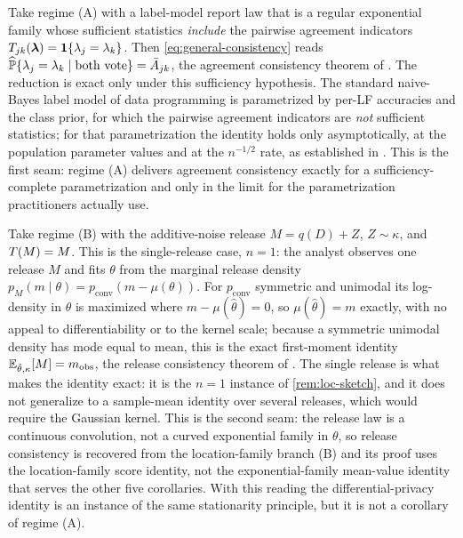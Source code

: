 \begin{corollary}
\label{cor:weaksup}
Take regime (A) with a label-model report law that is a regular
exponential family whose sufficient statistics \emph{include} the
pairwise agreement indicators $T_{jk}(\bm\lambda) = \mathbf{1}\{\lambda_j =
\lambda_k\}$. Then \eqref{eq:general-consistency} reads
$\widehat{\mathbb{P}}\{\lambda_j = \lambda_k \mid \text{both vote}\} =
\bar A_{jk}$, the agreement consistency theorem of
\citet{towell2026weaksupcoarsening}. The reduction is exact only under
this sufficiency hypothesis. The standard naive-Bayes label model of
data programming \citep{ratner2016data} is parametrized by per-LF
accuracies and the class prior, for which the pairwise agreement
indicators are \emph{not} sufficient statistics; for that
parametrization the identity holds only asymptotically, at the
population parameter values and at the $n^{-1/2}$ rate, as established
in \citet{towell2026weaksupcoarsening}. This is the first seam: regime
(A) delivers agreement consistency exactly for a sufficiency-complete
parametrization and only in the limit for the parametrization
practitioners actually use.
\end{corollary}

\begin{corollary}
\label{cor:dp}
Take regime (B) with the additive-noise release $M = q(D) + Z$, $Z
\sim \kappa$, and $T(M) = M$. This is the single-release case, $n = 1$:
the analyst observes one release $M$ and fits $\theta$ from the marginal
release density $p_M(m \mid \theta) = p_{\mathrm{conv}}(m -
\mu(\theta))$. For $p_{\mathrm{conv}}$ symmetric and unimodal its
log-density in $\theta$ is maximized where $m - \mu(\hat\theta) = 0$, so
$\mu(\hat\theta) = m$ exactly, with no appeal to differentiability or
to the kernel scale; because a symmetric unimodal density has mode equal
to mean, this is the exact first-moment identity $\mathbb{E}_{\hat\theta,\kappa}[M]
= m_{\mathrm{obs}}$, the release consistency theorem of
\citet{towell2026dpcoarsening}. The single release is what makes the
identity exact: it is the $n = 1$ instance of \cref{rem:loc-sketch}, and
it does not generalize to a sample-mean identity over several releases,
which would require the Gaussian kernel. This is the second seam: the
release law is a continuous convolution, not a curved exponential family
in $\theta$, so release consistency is recovered from the location-family
branch (B) and its proof uses the location-family score identity, not the
exponential-family mean-value identity that serves the other five
corollaries. With this reading the differential-privacy identity is an
instance of the same stationarity principle, but it is not a corollary
of regime (A).
\end{corollary}

